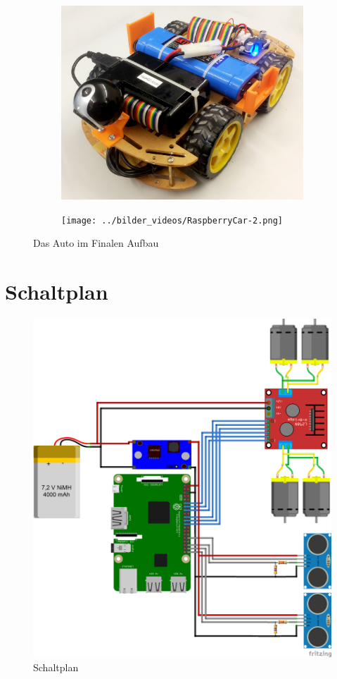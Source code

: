 \documentclass[a4paper, 12pt]{scrartcl}
\begin{document}
\begin{figure}[ht!] \centering
	\begin{subfigure}{.5\textwidth} \centering
		\includegraphics[width=\textwidth]{../bilder_videos/RaspberryCar.png}
	\end{subfigure}%
	\begin{subfigure}{.5\textwidth} \centering
		\texttt{[image: ../bilder\_videos/RaspberryCar-2.png]}
	\end{subfigure}%
	\caption{Das Auto im Finalen Aufbau}
	\label{auto}
\end{figure}

\section{Schaltplan}

\begin{figure}[ht!] \centering
	\includegraphics[width=.5\textwidth]{Schaltplan_Steckplatine.png}
	\caption{Schaltplan}
	\label{schaltplan}
\end{figure}
\end{document}
